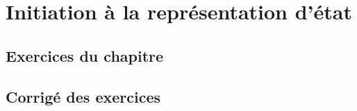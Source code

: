 \chapter{Initiation à la représentation d'état\label{chap-repreEtat}}

\newpage
\section*{Exercices du chapitre}


\exercice{}
\question

\newpage
\section*{Corrigé des exercices}


